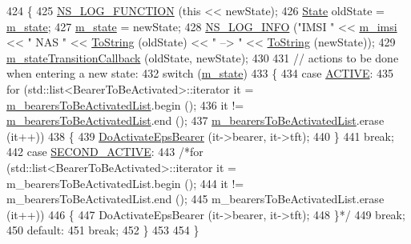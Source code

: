 \begin{DoxyCode}
424 \{
425   \hyperlink{log-macros-disabled_8h_a90b90d5bad1f39cb1b64923ea94c0761}{NS\_LOG\_FUNCTION} (\textcolor{keyword}{this} << newState);
426   \hyperlink{classns3_1_1EpcUeNas_a8047255fecfac11c9e1abe6f13d527dc}{State} oldState = \hyperlink{classns3_1_1EpcUeNas_a1717ecab2177c959111e14fdad7972d0}{m\_state};
427   \hyperlink{classns3_1_1EpcUeNas_a1717ecab2177c959111e14fdad7972d0}{m\_state} = newState;
428   \hyperlink{group__logging_gafbd73ee2cf9f26b319f49086d8e860fb}{NS\_LOG\_INFO} (\textcolor{stringliteral}{"IMSI "} << \hyperlink{classns3_1_1EpcUeNas_a0d541bfcaf7775052a7889bbd706fe02}{m\_imsi} << \textcolor{stringliteral}{" NAS "} << \hyperlink{namespacens3_a3d1f7e1bec1972e2ae8d64673fcfcd9c}{ToString} (oldState) << \textcolor{stringliteral}{" --> "} << 
      \hyperlink{namespacens3_a3d1f7e1bec1972e2ae8d64673fcfcd9c}{ToString} (newState));
429   \hyperlink{classns3_1_1EpcUeNas_a4a1b413f7ae25d1f74295fa2a76d55d3}{m\_stateTransitionCallback} (oldState, newState);
430 
431   \textcolor{comment}{// actions to be done when entering a new state:}
432   \textcolor{keywordflow}{switch} (\hyperlink{classns3_1_1EpcUeNas_a1717ecab2177c959111e14fdad7972d0}{m\_state})
433     \{
434     \textcolor{keywordflow}{case} \hyperlink{classns3_1_1EpcUeNas_a8047255fecfac11c9e1abe6f13d527dcaf80ef9922299d94e3623f0746cb478cc}{ACTIVE}:
435       \textcolor{keywordflow}{for} (std::list<BearerToBeActivated>::iterator it = 
      \hyperlink{classns3_1_1EpcUeNas_ae0828a4050fc7be31deba30f7b69d94a}{m\_bearersToBeActivatedList}.begin ();
436            it != \hyperlink{classns3_1_1EpcUeNas_ae0828a4050fc7be31deba30f7b69d94a}{m\_bearersToBeActivatedList}.end ();
437            \hyperlink{classns3_1_1EpcUeNas_ae0828a4050fc7be31deba30f7b69d94a}{m\_bearersToBeActivatedList}.erase (it++))
438         \{
439           \hyperlink{classns3_1_1EpcUeNas_a7a2c493d367fd7d526e8a0168438116b}{DoActivateEpsBearer} (it->bearer, it->tft);
440         \}
441       \textcolor{keywordflow}{break};
442     \textcolor{keywordflow}{case} \hyperlink{classns3_1_1EpcUeNas_a8047255fecfac11c9e1abe6f13d527dca030e2ae6d3c62c94c68fadd74bf5bf95}{SECOND\_ACTIVE}:
443           \textcolor{comment}{/*for (std::list<BearerToBeActivated>::iterator it = m\_bearersToBeActivatedList.begin ();}
444 \textcolor{comment}{               it != m\_bearersToBeActivatedList.end ();}
445 \textcolor{comment}{               m\_bearersToBeActivatedList.erase (it++))}
446 \textcolor{comment}{            \{}
447 \textcolor{comment}{              DoActivateEpsBearer (it->bearer, it->tft);}
448 \textcolor{comment}{            \}*/}
449           \textcolor{keywordflow}{break};
450     \textcolor{keywordflow}{default}:
451       \textcolor{keywordflow}{break};
452     \}
453 
454 \}
\end{DoxyCode}


